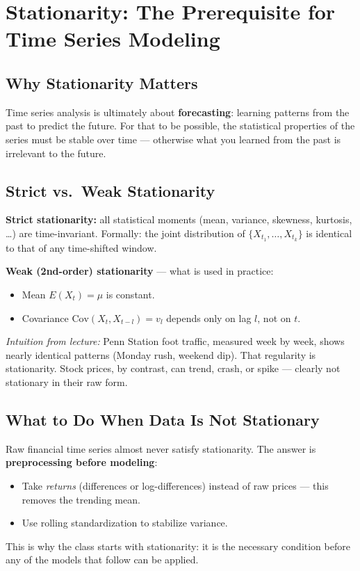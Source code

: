 \documentclass[11pt]{article}
\begin{document}
\section{Stationarity: The Prerequisite for Time Series Modeling}

\subsection{Why Stationarity Matters}
Time series analysis is ultimately about \textbf{forecasting}: learning patterns
from the past to predict the future. For that to be possible, the statistical
properties of the series must be stable over time --- otherwise what you learned
from the past is irrelevant to the future.

\subsection{Strict vs.\ Weak Stationarity}
\textbf{Strict stationarity:} all statistical moments (mean, variance, skewness,
kurtosis, \ldots) are time-invariant. Formally: the joint distribution of
$\{X_{t_1}, \ldots, X_{t_k}\}$ is identical to that of any time-shifted window.

\textbf{Weak (2nd-order) stationarity} --- what is used in practice:
\begin{itemize}
    \item Mean $E(X_t) = \mu$ is constant.
    \item Covariance $\text{Cov}(X_t, X_{t-l}) = v_l$ depends only on lag $l$,
      not on $t$.
\end{itemize}

\textit{Intuition from lecture:} Penn Station foot traffic, measured week by week,
shows nearly identical patterns (Monday rush, weekend dip). That regularity is
stationarity. Stock prices, by contrast, can trend, crash, or spike --- clearly
not stationary in their raw form.

\subsection{What to Do When Data Is Not Stationary}
Raw financial time series almost never satisfy stationarity. The answer is
\textbf{preprocessing before modeling}:
\begin{itemize}
    \item Take \emph{returns} (differences or log-differences) instead of raw
      prices --- this removes the trending mean.
    \item Use rolling standardization to stabilize variance.
\end{itemize}
This is why the class starts with stationarity: it is the necessary condition
before any of the models that follow can be applied.
\end{document}
